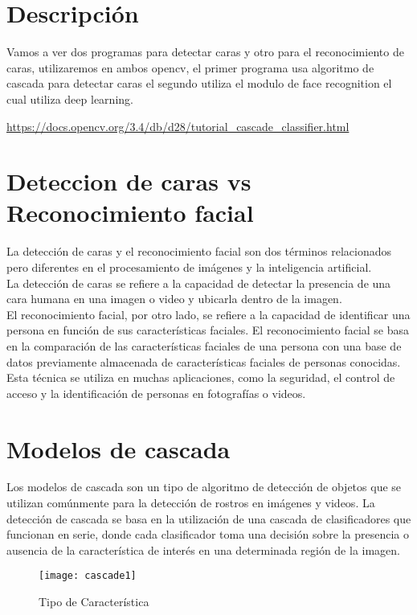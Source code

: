 \section{Descripción}
Vamos a ver dos programas para detectar caras y otro para el reconocimiento de caras,
utilizaremos en ambos opencv, el primer programa usa algoritmo de cascada para 
detectar caras
el segundo utiliza el modulo de face recognition el cual utiliza deep learning.

\url{https://docs.opencv.org/3.4/db/d28/tutorial_cascade_classifier.html}
\section{ Deteccion de caras vs Reconocimiento facial}

La detección de caras y el reconocimiento facial son dos términos relacionados 
pero diferentes en el procesamiento de imágenes y la inteligencia artificial.\\

La detección de caras se refiere a la capacidad de detectar la presencia de una 
cara humana en una imagen o video y ubicarla dentro de la imagen. \\

El reconocimiento facial, por otro lado, se refiere a la capacidad de identificar 
una persona en función de sus características faciales. El reconocimiento facial se 
basa en la comparación de las características faciales de una persona con una base 
de datos previamente almacenada de características faciales de personas conocidas.\\

Esta técnica se utiliza en muchas aplicaciones, como la seguridad, el control 
de acceso y la identificación de personas en fotografías o videos.

\section{Modelos de cascada}
Los modelos de cascada son un tipo de algoritmo de detección de objetos que se 
utilizan comúnmente para la detección de rostros en imágenes y videos. 
La detección de cascada se basa en la utilización de una cascada de 
clasificadores que funcionan en serie, donde cada clasificador toma una 
decisión sobre la presencia o ausencia de la característica de interés en una
 determinada región de la imagen.

\begin{figure}[H]
  \centering
  \texttt{[image: cascade1]}
  \caption{Tipo de Característica}\label{fig:característica}
\end{figure}

